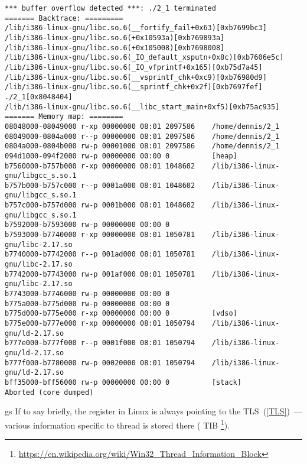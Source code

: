\begin{lstlisting}
*** buffer overflow detected ***: ./2_1 terminated
======= Backtrace: =========
/lib/i386-linux-gnu/libc.so.6(__fortify_fail+0x63)[0xb7699bc3]
/lib/i386-linux-gnu/libc.so.6(+0x10593a)[0xb769893a]
/lib/i386-linux-gnu/libc.so.6(+0x105008)[0xb7698008]
/lib/i386-linux-gnu/libc.so.6(_IO_default_xsputn+0x8c)[0xb7606e5c]
/lib/i386-linux-gnu/libc.so.6(_IO_vfprintf+0x165)[0xb75d7a45]
/lib/i386-linux-gnu/libc.so.6(__vsprintf_chk+0xc9)[0xb76980d9]
/lib/i386-linux-gnu/libc.so.6(__sprintf_chk+0x2f)[0xb7697fef]
./2_1[0x8048404]
/lib/i386-linux-gnu/libc.so.6(__libc_start_main+0xf5)[0xb75ac935]
======= Memory map: ========
08048000-08049000 r-xp 00000000 08:01 2097586    /home/dennis/2_1
08049000-0804a000 r--p 00000000 08:01 2097586    /home/dennis/2_1
0804a000-0804b000 rw-p 00001000 08:01 2097586    /home/dennis/2_1
094d1000-094f2000 rw-p 00000000 00:00 0          [heap]
b7560000-b757b000 r-xp 00000000 08:01 1048602    /lib/i386-linux-gnu/libgcc_s.so.1
b757b000-b757c000 r--p 0001a000 08:01 1048602    /lib/i386-linux-gnu/libgcc_s.so.1
b757c000-b757d000 rw-p 0001b000 08:01 1048602    /lib/i386-linux-gnu/libgcc_s.so.1
b7592000-b7593000 rw-p 00000000 00:00 0
b7593000-b7740000 r-xp 00000000 08:01 1050781    /lib/i386-linux-gnu/libc-2.17.so
b7740000-b7742000 r--p 001ad000 08:01 1050781    /lib/i386-linux-gnu/libc-2.17.so
b7742000-b7743000 rw-p 001af000 08:01 1050781    /lib/i386-linux-gnu/libc-2.17.so
b7743000-b7746000 rw-p 00000000 00:00 0
b775a000-b775d000 rw-p 00000000 00:00 0
b775d000-b775e000 r-xp 00000000 00:00 0          [vdso]
b775e000-b777e000 r-xp 00000000 08:01 1050794    /lib/i386-linux-gnu/ld-2.17.so
b777e000-b777f000 r--p 0001f000 08:01 1050794    /lib/i386-linux-gnu/ld-2.17.so
b777f000-b7780000 rw-p 00020000 08:01 1050794    /lib/i386-linux-gnu/ld-2.17.so
bff35000-bff56000 rw-p 00000000 00:00 0          [stack]
Aborted (core dumped)
\end{lstlisting}

gs\EMDASH{}
{If to say briefly, the  register in Linux is always pointing to the
\ac{TLS}~(\ref{TLS})~---various information specific to thread is stored there}
(
\ac{TIB} \footnote{\url{https://en.wikipedia.org/wiki/Win32_Thread_Information_Block}}). 

